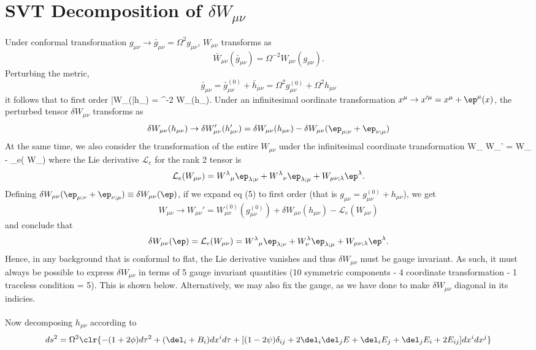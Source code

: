 \documentclass[10pt,letterpaper]{article}
\begin{document}
\section*{SVT Decomposition of $\delta W_{\mu\nu}$}
Under conformal transformation $g_{\mu\nu} \to \bar{g}_{\mu\nu} = \Omega^2 g_{\mu\nu}$, $W_{\mu\nu}$ transforms as
\[
	\bar W_{\mu\nu}(\bar g_{\mu\nu}) =  \Omega^{-2}W_{\mu\nu}(g_{\mu\nu}).
\]
Perturbing the metric, 
\[
	\bar g_{\mu\nu} = \bar g^{(0)}_{\mu\nu} + \bar h_{\mu\nu} = \Omega^2 g^{(0)}_{\mu\nu} + \Omega^2 h_{\mu\nu}
\]
it follows that to first order
\be
	\delta \bar W_{\mu\nu}(\bar h_{\mu\nu}) = \Omega^{-2} \delta W_{\mu\nu}(h_{\mu\nu}).
\ee
Under an infinitesimal oordinate transformation $x^\mu \to x'^\mu = x^\mu + \ep^\mu(x)$, the perturbed tensor $\delta W_{\mu\nu}$ transforms as
\[
	\delta W_{\mu\nu}(h_{\mu\nu}) \to \delta W'_{\mu\nu}(h'_{\mu\nu}) = \delta W_{\mu\nu}(h_{\mu\nu}) - \delta W_{\mu\nu}(\ep_{\mu;\nu}+\ep_{\nu;\mu})
\]
At the same time, we also consider the transformation of the entire $W_{\mu\nu}$ under the infinitesimal coordinate transformation
\be
	W_{\mu\nu} \to W_{\mu\nu}' = W_{\mu\nu} - _e( W_{\mu\nu})
\ee
where the Lie derivative $\mathcal L_e$ for the rank 2 tensor is
\[
	 \mathcal{L}_e( W_{\mu\nu}) = W^{\lambda}{}_\mu \ep_{\lambda;\nu} + W^{\lambda}{}_\nu \ep_{\lambda;\mu} + W_{\mu\nu;\lambda}\ep^\lambda.
\]
Defining $\delta W_{\mu\nu}(\ep_{\mu;\nu}+\ep_{\nu;\mu}) \equiv \delta W_{\mu\nu}(\ep)$, if we expand eq (5) to first order (that is $g_{\mu\nu} = g^{(0)}_{\mu\nu} + h_{\mu\nu}$), we get
\[
	W_{\mu\nu} \to W_{\mu\nu}' = W^{(0)}_{\mu\nu}(g^{(0)}_{\mu\nu})+ \delta W_{\mu\nu}(h_{\mu\nu})- \mathcal{L}_e( W_{\mu\nu})
\]
and conclude that
\[
	 \delta W_{\mu\nu}(\ep) =  \mathcal{L}_e( W_{\mu\nu}) = W^{\lambda}{}_\mu \ep_{\lambda;\nu} + W^{\lambda}_\nu \ep_{\lambda;\mu} + W_{\mu\nu;\lambda}\ep^\lambda.
\]
Hence, in any background that is conformal to flat, the Lie derivative vanishes and thus $\delta W_{\mu\nu}$ must be gauge invariant. As such, it must always be possible to express $\delta W_{\mu\nu}$ in terms of 5 gauge invariant quantities (10 symmetric components - 4 coordinate transformation - 1 traceless condition = 5). This is shown below. Alternatively, we may also fix the gauge, as we have done to make $\delta W_{\mu\nu}$ diagonal in its indicies. 
\\ \\
Now decomposing $h_{\mu\nu}$ according to 
\[
	ds^2 = \Omega^2\clr{ -(1+2\phi)d\tau^2 + (\del_i +B_i)dx^id\tau + [(1-2\psi)\delta_{ij}+2\del_i\del_j E + \del_i E_j+\del_j E_i + 2E_{ij}]dx^i dx^j}
\]
\end{document}
